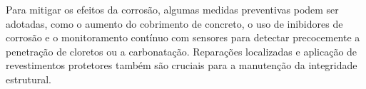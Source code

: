 Para mitigar os efeitos da corrosão, algumas medidas preventivas podem ser adotadas, como o aumento do cobrimento de concreto, o uso de inibidores de corrosão e o monitoramento contínuo com sensores para detectar precocemente a penetração de cloretos ou a carbonatação. Reparações localizadas e aplicação de revestimentos protetores também são cruciais para a manutenção da integridade estrutural.



